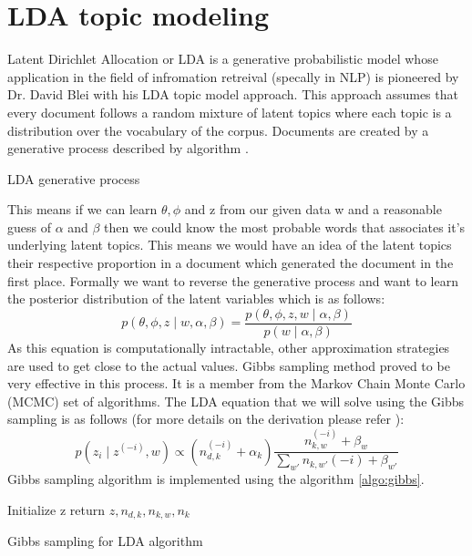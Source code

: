 \section{LDA topic modeling}
\label{sec:lda}
Latent Dirichlet Allocation or LDA is a generative probabilistic model whose application in the field of infromation retreival (specally in NLP) is pioneered by Dr. David Blei with his LDA topic model approach. This approach assumes that every document follows a random mixture of latent topics where each topic is a distribution over the vocabulary of the corpus. Documents are created by a generative process described by algorithm .
\begin{algorithm}[htp]
\label{algo:ldaGen}
 \SetAlgoLined\DontPrintSemicolon
 \caption{LDA generative process}
\end{algorithm}
This means if we can learn $\theta, \phi$ and z from our given data w and a reasonable guess of $\alpha$ and $\beta$ then we could know the most probable words that associates it's underlying latent topics. This means we would have an idea of the latent topics their respective proportion in a document which generated the document in the first place. Formally we want to reverse the generative process and want to learn the posterior distribution of the latent variables which is as follows:
\begin{equation}
p(\theta, \phi, z \mid w, \alpha, \beta) = \frac{p(\theta, \phi, z, w \mid \alpha, \beta)}{p(w \mid \alpha, \beta)}
\end{equation}
As this equation is computationally intractable, other approximation strategies are used to get close to the actual values. Gibbs sampling method proved to be very effective in this process. It is a member from the Markov Chain Monte Carlo (MCMC) set of algorithms. The LDA equation that we will solve using the Gibbs sampling is as follows (for more details on the derivation please refer ):
\begin{equation}
p(z_i \mid z^{(-i)}, w) \propto (n_{d,k}^{(-i)} + \alpha_k) \frac{n_{k,w}^{(-i)}+\beta_w}{\sum_{w'} n_{k,w'}{(-i)}+\beta_{w'}}
\end{equation}
Gibbs sampling algorithm is implemented using the algorithm \ref{algo:gibbs}.
\begin{algorithm}[htp]
\label{algo:gibbs}
 \SetAlgoLined\DontPrintSemicolon
 Initialize z\;
 return $z, n_{d,k}, n_{k,w}, n_k$\;
 \caption{Gibbs sampling for LDA algorithm}
\end{algorithm}
